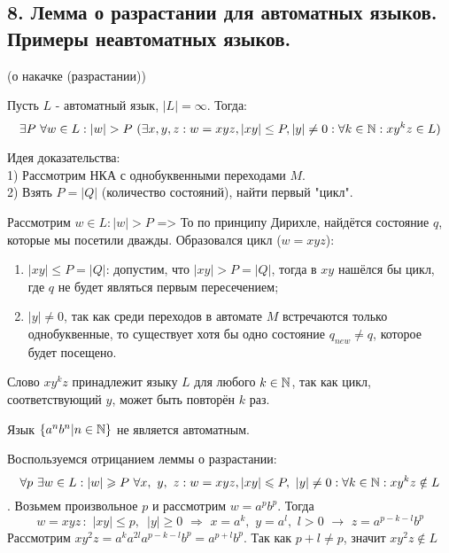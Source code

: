 \subsection{8. Лемма о разрастании для автоматных языков. Примеры неавтоматных языков.}

\Lemma (о накачке (разрастании))

Пусть $L$ - автоматный язык, $|L| = \infty$. Тогда:
$$\exists P \ \forall w \in L: |w| > P \ (\exists x, y, z: w = xyz, |xy| \leq P, |y| \neq 0: \forall k \in \mathbb{N}: xy^kz \in L)$$

Идея доказательства: \\
1) Рассмотрим НКА с однобуквенными переходами $M$. \\
2) Взять $P = |Q|$ (количество состояний), найти первый "цикл".

Рассмотрим $w \in L: |w| > P$ => То по принципу Дирихле, найдётся  состояние $q$, которые мы посетили дважды. Образовался цикл ($w = xyz$):

\begin{figure}[h]
    \hspace{-4ex} \begin{minipage}[h]{1\linewidth}
    \end{minipage}
    \hspace{-4ex}
\end{figure}

\begin{enumerate}
    \item $|xy| \leqslant P = |Q|$: допустим, что $|xy| > P = |Q|$, тогда в $xy$ нашёлся бы цикл, где $q$ не будет являться первым пересечением;
    \item $|y| \neq 0$, так как среди переходов в автомате $M$ встречаются только однобуквенные, то существует хотя бы одно состояние $q_{new} \neq q$, которое будет посещено.
\end{enumerate}

Слово $xy^kz$ принадлежит языку $L$ для любого $k \in \mathbb{N}$, так как цикл, соответствующий $y$, может быть повторён $k$ раз. \EndProof

\Example Язык $\{ a^n b^n | n \in \mathbb{N} \}$ не является автоматным.

\Proof Воспользуемся отрицанием леммы о разрастании:
$$\forall p \ \exists w \in L : |w| \geqslant P \ \forall x, \ y, \ z: w = xyz, |xy| \leqslant P, \ |y| \neq 0: \forall k \in \N : xy^kz \notin L$$.
Возьмем произвольное $p$ и рассмотрим $w=a^pb^p$. Тогда 
$$w=xyz \,:\,\, |xy|\leqslant p, \,\,\, |y|\geqslant 0 \,\,\Rightarrow\,\, x = a^k, \,\, y=a^l, \,\, l > 0 \,\, \rightarrow\,\, z=a^{p-k-l}b^p$$
Рассмотрим $xy^2z = a^ka^{2l}a^{p-k-l}b^p = a^{p+l}b^p$. Так как $p+l \neq p$, значит $xy^2z \notin L$\,\,\, \EndProof